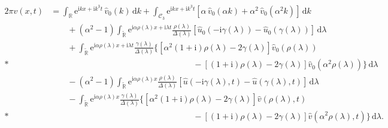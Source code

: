 \documentclass[10pt,a4paper]{amsart}
\newcommand{\CAiry}{{\mathcal C_3}}%
\newcommand{\D}{\ensuremath{\,\mathrm{d}}}
\newcommand{\RR}{\mathbb R}              %
\newcommand{\la}{\ensuremath{\lambda}}
\newcommand{\nn}{\nonumber}
\newcommand{\re}{\ensuremath{\mathrm{e}}}
\newcommand{\ri}{\ensuremath{\mathrm{i}}}
\newcommand{\what}{\widehat}
\begin{document}
\begin{align}
  2\pi v(x, t)
  &=
  \int_{\RR} \re^{\ri kx+\ri k^3 t} \, \what v_0(k) \D k
  +
  \int_{\CAiry} \re^{\ri kx+\ri k^3 t} \left[\alpha \, \what v_0(\alpha k) + \alpha^2 \, \what v_0(\alpha^2 k)\right] \D k
  \nn\\
  &\qquad
  +
  \left(\alpha^2-1\right)
  \int_{\widetilde{\RR}} \re^{\ri\alpha \rho(\lambda) x+\ri\lambda t}
  \frac{\rho(\lambda)}{\Delta(\la)}
  \left[\what u_0(-\ri\gamma(\lambda)) - \what u_0(\gamma(\lambda))\right] \D\lambda
  \nn\\
  &\qquad
  +
  \int_{\widetilde{\RR}} \re^{\ri\alpha \rho(\lambda) x+\ri\lambda t}
  \frac{\gamma(\lambda)}{\Delta(\la)}
  \Big\{\left[\alpha^2 \left(1+\ri\right) \rho(\lambda) - 2\gamma(\lambda)\right] \what v_0(\rho(\lambda))
  \nn\\*
  &\hspace{17em}
  -
  \left[\left(1+\ri\right) \rho(\lambda) - 2\gamma(\lambda)\right]
  \what v_0(\alpha^2 \rho(\lambda))
  \Big\} \D\lambda
  \nn\\
  &\qquad
  -
  \left(\alpha^2-1\right)
  \int_{\widetilde{\RR}} \re^{\ri\alpha \rho(\lambda) x}
  \frac{\rho(\lambda)}{\Delta(\la)} \left[\what u(-\ri\gamma(\lambda), t) - \what u(\gamma(\lambda), t)\right] \D\lambda
  \nn\\
  &\qquad
  -
  \int_{\widetilde{\RR}} \re^{\ri\alpha \rho(\lambda) x}
  \frac{\gamma(\lambda)}{\Delta(\la)}
  \Big\{\left[\alpha^2 \left(1+\ri\right) \rho(\lambda) - 2\gamma(\lambda)\right] \what v(\rho(\lambda), t)
  \nn\\*
  &\hspace{17em}
  -
  \left[\left(1+\ri\right) \rho(\lambda) - 2\gamma(\lambda)\right]
  \what v(\alpha^2 \rho(\lambda), t)
  \Big\} \D\lambda.
  \label{eqn:biSAiry.v.withExtraTerms}
\end{align}
\end{document}
